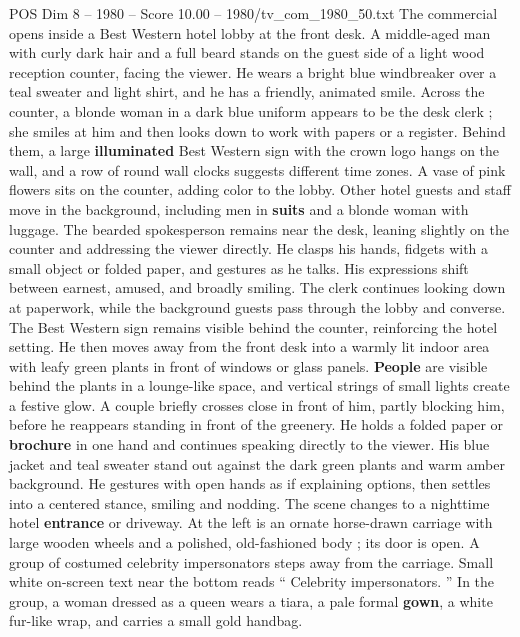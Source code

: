 \begin{textsample}{POS Dim 8 – 1980 – Score 10.00 – 1980/tv\_com\_1980\_50.txt}  \label{ex:f8_pos_041}
The commercial opens inside a Best Western hotel lobby at the front desk.
A middle-aged man with curly dark hair and a full beard stands on the guest side of a light wood reception counter, facing the viewer.
He wears a bright blue windbreaker over a teal sweater and light shirt, and he has a friendly, animated smile.
Across the counter, a blonde woman in a dark blue uniform appears to be the desk clerk ; she smiles at him and then looks down to work with papers or a register.
Behind them, a large \textbf{illuminated} Best Western sign with the crown logo hangs on the wall, and a row of round wall clocks suggests different time zones.
A vase of pink flowers sits on the counter, adding color to the lobby.
Other hotel guests and staff move in the background, including men in \textbf{suits} and a blonde woman with luggage.
The bearded spokesperson remains near the desk, leaning slightly on the counter and addressing the viewer directly.
He clasps his hands, fidgets with a small object or folded paper, and gestures as he talks.
His expressions shift between earnest, amused, and broadly smiling.
The clerk continues looking down at paperwork, while the background guests pass through the lobby and converse.
The Best Western sign remains visible behind the counter, reinforcing the hotel setting.
He then moves away from the front desk into a warmly lit indoor area with leafy green plants in front of windows or glass panels. \textbf{People} are visible behind the plants in a lounge-like space, and vertical strings of small lights create a festive glow.
A couple briefly crosses close in front of him, partly blocking him, before he reappears standing in front of the greenery.
He holds a folded paper or \textbf{brochure} in one hand and continues speaking directly to the viewer.
His blue jacket and teal sweater stand out against the dark green plants and warm amber background.
He gestures with open hands as if explaining options, then settles into a centered stance, smiling and nodding.
The scene changes to a nighttime hotel \textbf{entrance} or driveway.
At the left is an ornate horse-drawn carriage with large wooden wheels and a polished, old-fashioned body ; its door is open.
A group of costumed celebrity impersonators steps away from the carriage.
Small white on-screen text near the bottom reads “ Celebrity impersonators. ” In the group, a woman dressed as a queen wears a tiara, a pale formal \textbf{gown}, a white fur-like wrap, and carries a small gold handbag.

\end{textsample}
